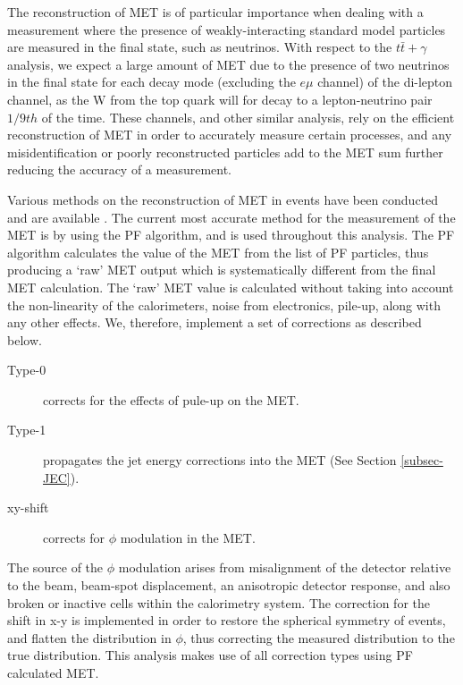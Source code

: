 The reconstruction of MET is of particular importance when dealing with a measurement where the presence of weakly-interacting standard model particles are measured in the final state, such as neutrinos.  With respect to the $t\bar{t}+\gamma$ analysis, we expect a large amount of MET due to the presence of two neutrinos in the final state for each decay mode (excluding the $e\mu$ channel) of the di-lepton channel, as the W from the top quark will for decay to a lepton-neutrino pair $1/9th$ of the time. These channels, and other similar analysis, rely on the efficient reconstruction of MET in order to accurately measure certain processes, and any misidentification or poorly reconstructed particles add to the MET sum further reducing the accuracy of a measurement.  

Various methods on the reconstruction of MET in events have been conducted and are available \cite{1748-0221-6-09-P09001}. The current most accurate method for the measurement of the MET is by using the PF algorithm, and is used throughout this analysis. The PF algorithm calculates the value of the MET from the list of PF particles, thus producing a `raw' MET output which is systematically different from the final MET calculation. The `raw' MET value is calculated without taking into account the non-linearity of the calorimeters, noise from electronics, pile-up, along with any other effects. We, therefore, implement a set of corrections as described below.

\begin{description}
	\item[Type-0] corrects for the effects of pule-up on the MET.
	\item[Type-1] propagates the jet energy corrections into the MET (See Section \ref{subsec-JEC}). 
	\item[xy-shift] corrects for $\phi$ modulation in the MET.
\end{description}

The source of the $\phi$ modulation arises from misalignment of the detector relative to the beam, beam-spot displacement, an anisotropic detector response, and also broken or inactive cells within the calorimetry system. The correction for the shift in x-y is implemented in order to restore the spherical symmetry of events, and flatten the distribution in $\phi$, thus correcting the measured distribution to the true distribution. This analysis makes use of all correction types using PF calculated MET. 